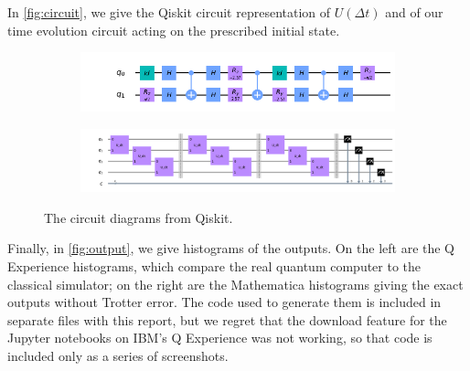 \documentclass[10pt]{amsart}
\theoremstyle{definition}
\begin{document}
In \cref{fig:circuit}, we give the Qiskit circuit representation of
$U(\Delta t)$ and of our time evolution circuit acting on the prescribed
initial state.

\begin{figure}[ht]
  \begin{subfigure}{0.7\textwidth}
    \centering
    \includegraphics[width=\linewidth]{circ_Udt.png}
  \end{subfigure}
  
  \begin{subfigure}{0.9\textwidth}
    \centering
    \includegraphics[width=\linewidth]{circ_timeEv.png}
  \end{subfigure}
  \caption{The circuit diagrams from Qiskit.}
  \label{fig:circ}
\end{figure}
Finally, in \cref{fig:output}, we give histograms of the outputs. On the left
are the Q Experience histograms, which compare the real quantum computer to the
classical simulator; on the right are the Mathematica histograms giving the
exact outputs without Trotter error. The code used to generate them is included
in separate files with this report, but we regret that the download feature for
the Jupyter notebooks on IBM's Q Experience was not working, so that code
is included only as a series of screenshots.
\end{document}
